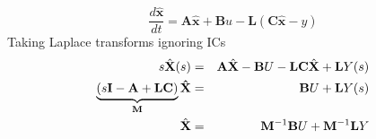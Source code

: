 
\[
\frac{d\hat{\mathbf{x}}}{dt} = \mathbf{A}\hat{\mathbf{x}}+\mathbf{B}u-\mathbf{L}(\mathbf{C}\hat{\mathbf{x}} - y)
\]
Taking Laplace transforms ignoring ICs
\begin{eqnarray*}
s\hat{\mathbf{X}}(s) & = & \mathbf{A}\hat{\mathbf{X}} - \mathbf{B}U - \mathbf{LC}\hat{\mathbf{X}} + \mathbf{L}Y(s) \\	
\underbrace {(s{\bf{I}} - {\bf{A}} + {\bf{LC}})}_{{\bf{M}}}{\bf{\hat X}} & = & {\bf B}U + {\bf{L}}Y(s) \\
\hat{\mathbf{X}} & = & \mathbf{M}^{-1}\mathbf{B}U + \mathbf{M}^{-1}{\bf{L}}Y
\end{eqnarray*}


\endinput

